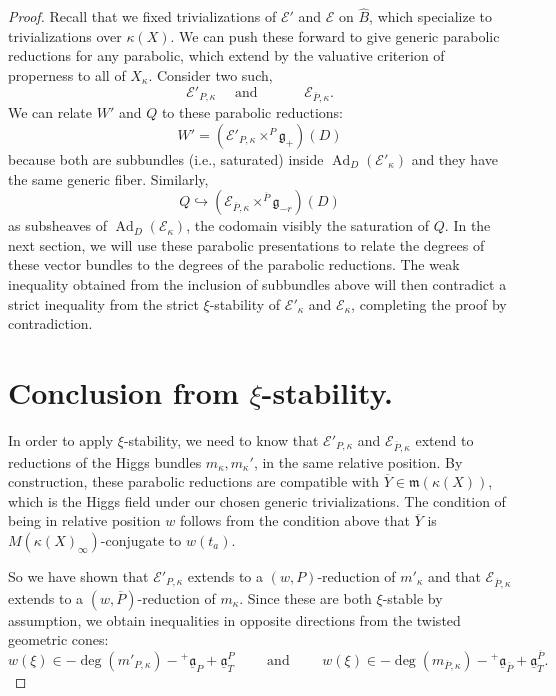 \documentclass[openany]{amsbook}
\theoremstyle{definition}
\theoremstyle{remark}
\numberwithin{equation}{section}
\newcommand{\cE}{\mathcal{E}}
\newcommand{\ol}[1]{\overline{#1}}
\newcommand{\ul}[1]{\underline{#1}}
\renewcommand{\-}{\operatorname{-}}
\renewcommand{\a}{\mathfrak{a}}
\newcommand{\on}[1]{\operatorname{#1}}
\newcommand{\fm}{\mathfrak{m}}
\renewcommand{\fm}{\mathfrak{m}}
\renewcommand{\fg}{\mathfrak{g}}
\newcommand{\Ad}{\on{Ad}}
\newcommand{\ga}{\ul{\a}}
\newcommand{\gobtcone}{{}^+ \ul{\a}}
\begin{document}
\begin{proof}
Recall that we fixed trivializations of $\cE'$ and $\cE$ on $\widehat{B}$, which specialize to trivializations over $\kappa(X)$. We can push these forward to give generic parabolic reductions for any parabolic, which extend by the valuative criterion of properness to all of $X_{\kappa}$. Consider two such,
$$
    \cE'_{P, \kappa} \quad \text{ and } \quad \qquad \cE_{\ol{P}, \kappa}.
$$
We can relate $W'$ and $Q$ to these parabolic reductions:
$$
    W' = (\cE'_{P, \kappa} \times^P \fg_+)(D)
$$
because both are subbundles (i.e., saturated) inside $\Ad_D(\cE'_{\kappa})$ and they have the same generic fiber. Similarly, 
$$
    Q \hookrightarrow (\cE_{\ol{P}, \kappa} \times^{\ol{P}} \fg_{-r})(D)
$$
as subsheaves of $\Ad_D(\cE_{\kappa})$, the codomain visibly the saturation of $Q$. In the next section, we will use these parabolic presentations to relate the degrees of these vector bundles to the degrees of the parabolic reductions. The weak inequality obtained from the inclusion of subbundles above will then contradict a strict inequality from the strict $\xi$-stability of $\cE'_{\kappa}$ and $\cE_{\kappa}$, completing the proof by contradiction.













\section{\texorpdfstring{Conclusion from $\xi$-stability.}{Conclusion from xi-stability.}}

In order to apply $\xi$-stability, we need to know that $\cE'_{P, \kappa}$ and $\cE_{\ol{P},\kappa}$ extend to reductions of the Higgs bundles $m_{\kappa}, m_{\kappa}'$, in the same relative position. By construction, these parabolic reductions are compatible with $\ol{Y} \in \fm(\kappa(X))$, which is the Higgs field under our chosen generic trivializations. The condition of being in relative position $w$ follows from the condition above that $\ol{Y}$ is $M(\kappa(X)_\infty)$-conjugate to $w(t_a)$.

So we have shown that $\cE'_{P, \kappa}$ extends to a $(w,P)$-reduction of $m'_{\kappa}$ and that $\cE_{\ol{P},\kappa}$ extends to a $(w,\ol{P})$-reduction of $m_\kappa$. Since these are both $\xi$-stable by assumption, we obtain inequalities in opposite directions from the twisted geometric cones:
\[
    w(\xi) \in - \deg(m'_{P,\kappa}) -\gobtcone_P + \ga_T^P \qquad \text{ and } \qquad  w(\xi) \in - \deg(m_{\ol{P},\kappa}) - \gobtcone_{\ol{P}} + \ga_T^{\ol{P}}.
\]


\end{proof}
\end{document}
